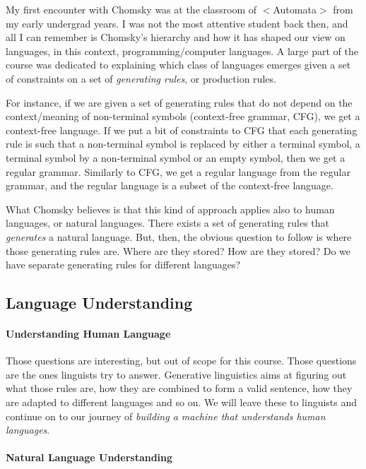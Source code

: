\documentclass{report}
\begin{document}
My first encounter with Chomsky was at the classroom of $<$Automata$>$ from my
early undergrad years. I was not the most attentive student back then, and all I
can remember is Chomsky's hierarchy and how it has shaped our view on languages,
in this context, programming/computer languages.  A large part of the course was
dedicated to explaining which class of languages emerges given a set of
constraints on a set of {\it generating rules}, or production rules. 

For instance, if we are given a set of generating rules that do not depend on
the context/meaning of non-terminal symbols (context-free grammar, CFG), we get
a context-free language. If we put a bit of constraints to CFG that each
generating rule is such that a non-terminal symbol is replaced by either a
terminal symbol, a terminal symbol by a non-terminal symbol or an empty symbol,
then we get a regular grammar. Similarly to CFG, we get a regular language from
the regular grammar, and the regular language is a subset of the context-free
language.

What Chomsky believes is that this kind of approach applies also to human
languages, or natural languages. There exists a set of generating rules that
{\it generates} a natural language. But, then, the obvious question to follow is
where those generating rules are. Where are they stored? How are they stored? Do
we have separate generating rules for different languages? 

\subsection{Language Understanding}
\label{sec:language_understanding_wrong}

\paragraph{Understanding Human Language}

Those questions are interesting, but out of scope for this course. Those
questions are the ones linguists try to answer. Generative linguistics aims at
figuring out what those rules are, how they are combined to form a valid
sentence, how they are adapted to different languages and so on. We will leave
these to linguists and continue on to our journey of {\it building a machine
that understands human languages}. 

\paragraph{Natural Language Understanding}
\end{document}
